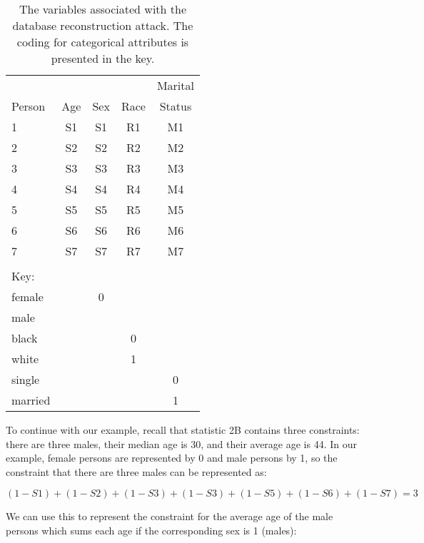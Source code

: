 \documentclass[runningheads]{llncs}
\begin{document}
\begin{center}
\begin{table}
\begin{tabular}{l|cccc}
       &     &     &      & Marital  \\
Person & Age & Sex & Race & Status   \\
\hline                             
1      & S1  & S1  & R1   & M1       \\
2      & S2  & S2  & R2   & M2       \\
3      & S3  & S3  & R3   & M3       \\
4      & S4  & S4  & R4   & M4       \\
5      & S5  & S5  & R5   & M5       \\
6      & S6  & S6  & R6   & M6       \\
7      & S7  & S7  & R7   & M7       \\
\hline
\\
\multicolumn{1}{l}{Key:}\\
\hline
female &     &  0  & \\
male   &     &     & \\
\hline
black  &     &     &  0   & \\
white  &     &     &  1   & \\
\hline
single &     &     &      &   0\\
married&     &     &      &   1\\
\hline
\end{tabular}
\caption{The variables associated with the database reconstruction
  attack. The coding for categorical attributes is presented in the key.}\label{variables}
\end{table}

\end{center}

To continue with our example, recall that statistic 2B contains three
constraints: there are three males, their median age is 30, and their
average age is 44. In our example, female persons
are represented by 0
and male persons by 1, so the constraint that there are three males can be represented as:

\begin{equation}
(1-S1) + (1-S2) + (1-S3) + (1-S3) + (1-S5) + (1-S6) + (1-S7) = 3
\end{equation}

We can use this to represent the constraint for the average age of the
male persons which sums each age if the corresponding sex is 1 (males):
\end{document}
